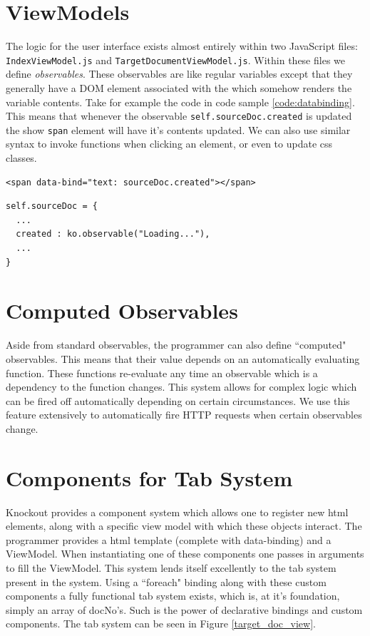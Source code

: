 \documentclass{l4proj}
\newcommand{\code}[1]{\texttt{#1}}
\newenvironment{codelisting}{\captionsetup{type=listing}}{}
\begin{document}
\section{ViewModels}
The logic for the user interface exists almost entirely within two JavaScript files: \code{IndexViewModel.js} and \code{TargetDocumentViewModel.js}. Within these files we define \textit{observables}. These observables are like regular variables except that they generally have a DOM element associated with the which somehow renders the variable contents.
Take for example the code in code sample \ref{code:databinding}. This means that whenever the observable \code{self.sourceDoc.created} is updated the show \code{span} element will have it's contents updated. We can also use similar syntax to invoke functions when clicking an element, or even to update css classes.
\begin{codelisting}
\begin{verbatim}
<span data-bind="text: sourceDoc.created"></span>
\end{verbatim}
\begin{verbatim}
self.sourceDoc = {
  ...
  created : ko.observable("Loading..."),
  ...
}
\end{verbatim}
\label{code:databinding}
\end{codelisting}

\section{Computed Observables}
Aside from standard observables, the programmer can also define ``computed" observables. This means that their value depends on an automatically evaluating function. These functions re-evaluate any time an observable which is a dependency to the function changes. This system allows for complex logic which can be fired off automatically depending on certain circumstances.
We use this feature extensively to automatically fire HTTP requests when certain observables change.

\section{Components for Tab System}
Knockout provides a component system which allows one to register new html elements, along with a specific view model with which these objects interact. The programmer provides a html template (complete with data-binding) and a ViewModel. When instantiating one of these components one passes in arguments to fill the ViewModel.
This system lends itself excellently to the tab system present in the system. Using a ``foreach" binding along with these custom components a fully functional tab system exists, which is, at it's foundation, simply an array of docNo's. Such is the power of declarative bindings and custom components. The tab system can be seen in Figure \ref{target_doc_view}.
\end{document}
